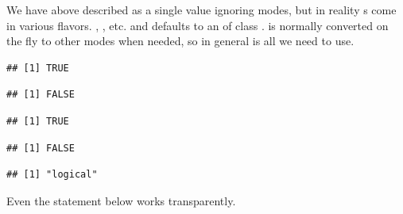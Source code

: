 \documentclass[krantz2]{krantz}\usepackage{knitr}
\begin{document}
\begin{explainbox}
We have above described  as a single value ignoring modes, but in reality s come in various flavors. , , etc. and  defaults to an  of class .  is normally converted on the fly to other modes when needed, so in general  is all we need to use.

\begin{knitrout}\footnotesize
{}\color{fgcolor}\begin{kframe}
\begin{alltt}
 \hlkwb{<-} \hlstd{(}\hlstd{,} \hlstd{)}
\hlstd{(a[}\hlstd{])}
\end{alltt}
\begin{verbatim}
## [1] TRUE
\end{verbatim}
\begin{alltt}
\hlstd{(}\hlstd{)}
\end{alltt}
\begin{verbatim}
## [1] FALSE
\end{verbatim}
\begin{alltt}
 \hlkwb{<-} \hlstd{(}\hlstd{,} \hlstd{)}
\hlstd{(b[}\hlstd{])}
\end{alltt}
\begin{verbatim}
## [1] TRUE
\end{verbatim}
\begin{alltt}
\hlstd{(}\hlstd{)}
\end{alltt}
\begin{verbatim}
## [1] FALSE
\end{verbatim}
\begin{alltt}
\hlstd{(}\hlstd{)}
\end{alltt}
\begin{verbatim}
## [1] "logical"
\end{verbatim}
\end{kframe}
\end{knitrout}

Even the statement below works transparently.

\begin{knitrout}\footnotesize
{}\color{fgcolor}\begin{kframe}
\begin{alltt}
\hlstd{a[}\hlstd{]} \hlkwb{<-} \hlstd{b[}\hlstd{]}
\end{alltt}
\end{kframe}
\end{knitrout}
\end{explainbox}
\end{document}
